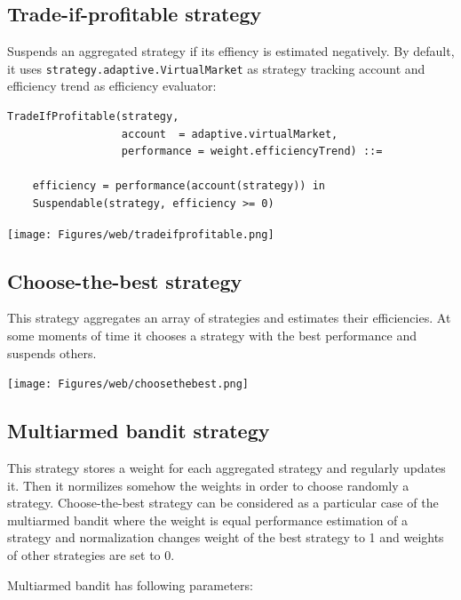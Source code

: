 \documentclass[a4paper,11pt]{article}
\begin{document}
\subsection{Trade-if-profitable
strategy}\label{trade-if-profitable-strategy}

Suspends an aggregated strategy if its effiency is estimated negatively.
By default, it uses \texttt{strategy.adaptive.VirtualMarket} as strategy
tracking account and efficiency trend as efficiency evaluator:

\begin{verbatim}
TradeIfProfitable(strategy,
                  account  = adaptive.virtualMarket,
                  performance = weight.efficiencyTrend) ::=

    efficiency = performance(account(strategy)) in
    Suspendable(strategy, efficiency >= 0)
\end{verbatim}

\centerline{\texttt{[image: Figures/web/tradeifprofitable.png]}}

\subsection{Choose-the-best strategy}\label{choose-the-best-strategy}

This strategy aggregates an array of strategies and estimates their
efficiencies. At some moments of time it chooses a strategy with the
best performance and suspends others.

\centerline{\texttt{[image: Figures/web/choosethebest.png]}}

\subsection{Multiarmed bandit
strategy}\label{multiarmed-bandit-strategy}

This strategy stores a weight for each aggregated strategy and regularly
updates it. Then it normilizes somehow the weights in order to choose
randomly a strategy. Choose-the-best strategy can be considered as a
particular case of the multiarmed bandit where the weight is equal
performance estimation of a strategy and normalization changes weight of
the best strategy to 1 and weights of other strategies are set to 0.

Multiarmed bandit has following parameters:
\end{document}
